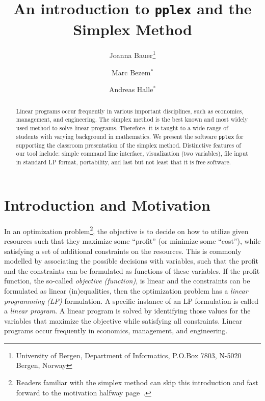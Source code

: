\documentclass[ukenglish,a4]{article}
\begin{document}
\title{An introduction to \texttt{pplex} and the Simplex Method}

\author{
Joanna Bauer\thanks{University of Bergen, Department of Informatics, P.O.Box 7803, N-5020 Bergen, Norway}
\and
Marc Bezem$^*$
\and
Andreas Halle$^*$}

\maketitle

\begin{abstract}
Linear programs occur frequently in various important disciplines, such as economics, management, and engineering.
The simplex method is the best known and most widely used method to solve linear programs.
Therefore, it is taught to a wide range of students with varying background in mathematics.
We present the software \texttt{pplex} for supporting
the classroom presentation of the simplex method.
Distinctive features of our tool include: 
simple command line interface,
visualization (two variables), 
file input in standard LP format,
portability, 
and last but not least that it is free software.
\end{abstract}

\section{Introduction and Motivation}\label{sec:intro}

In an optimization problem\footnote{Readers familiar with the simplex method can skip this 
introduction and fast forward to the motivation halfway page~\pageref{motivation}.}, 
the objective is to decide on how to utilize given resources such that they maximize some ``profit''
(or minimize some ``cost''), while satisfying a set of additional constraints on the resources.
This is commonly modelled by associating the possible decisions with variables, such that the profit 
and the constraints can be formulated as functions of these variables. 
If the profit function, the so-called \emph{objective (function)}, is linear and the constraints can be formulated as linear (in)equalities, then the optimization problem has a \emph{linear programming (LP)} formulation. A specific instance of an LP formulation is called a \emph{linear program}.
A linear program is solved by identifying those values for the variables that maximize the objective while satisfying all constraints.
Linear programs occur frequently in economics, management, and engineering.
\end{document}
